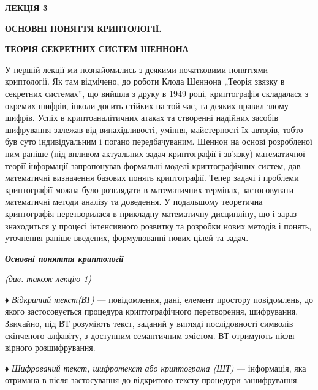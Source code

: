 {\bfseries
ЛЕКЦІЯ  3}


\bigskip

{\centering\bfseries
ОСНОВНІ ПОНЯТТЯ КРИПТОЛОГІЇ.
\par}

{\centering\bfseries
ТЕОРІЯ СЕКРЕТНИХ СИСТЕМ ШЕННОНА
\par}


\bigskip


\bigskip

У першій лекції ми познайомились з деякими початковими поняттями криптології. Як
там відмічено, до роботи Клода Шеннона „Теорія зв{\textquotesingle}язку в
секретних системах”, що вийшла з друку в 1949 році, криптографія складалася з 
окремих шифрів, інколи досить стійких на той час, та деяких правил злому
шифрів. Успіх в криптоаналітичних атаках та створенні надійних засобів
шифрування  залежав від винахідливості, уміння, майстерності їх авторів, тобто
був суто індивідуальним і погано передбачуваним. Шеннон на основі розробленої
ним раніше (під впливом актуальних задач криптографії і зв’язку) математичної
теорії інформації запропонував формальні моделі криптографічних систем, дав
математичні визначення базових понять криптографії. Тепер задачі і проблеми
криптографії можна було розглядати в математичних термінах, застосовувати
математичні методи аналізу та доведення. У подальшому теоретична криптографія 
перетворилася в прикладну математичну дисципліну, що і зараз знаходиться  у
процесі інтенсивного розвитку та розробки нових методів і понять, уточнення
раніше введених, формулюванні нових цілей та задач. 


\bigskip


\bigskip

{\centering\bfseries\itshape
Основні поняття криптології
\par}

{\centering\itshape
(див. також лекцію 1)
\par}


\bigskip


\bigskip

$\blacklozenge$ \textit{Відкритий текст(ВТ)} --- повідомлення, дані, елемент
простору повідомлень, до якого застосовується процедура криптографічного
перетворення, шифрування. Звичайно, під ВТ розуміють текст, заданий у вигляді
послідовності символів скінченого алфавіту, з доступним семантичним змістом. ВТ
отримують після вірного розшифрування.

$\blacklozenge$ \textit{Шифрований текст, шифротекст  або криптограма (ШТ)} ---
інформація, яка отримана в після застосування до відкритого тексту процедури
зашифрування.

